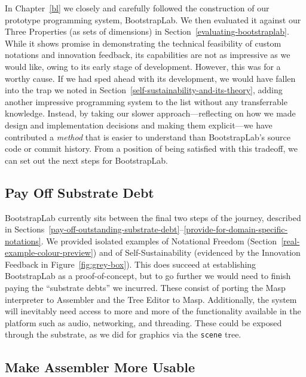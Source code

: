 \documentclass[ twoside,openright,titlepage,numbers=noenddot,headinclude,footinclude,cleardoublepage=empty,abstract=on,
                BCOR=5mm,paper=a4,fontsize=11pt
                ]{scrreprt}
\theoremstyle{definition}
\begin{document}
In Chapter~\ref{bl} we closely and carefully followed the construction
of our prototype programming system, BootstrapLab. We then evaluated it
against our Three Properties (as sets of dimensions) in
Section~\ref{evaluating-bootstraplab}. While it shows promise in
demonstrating the technical feasibility of custom notations and
innovation feedback, its capabilities are not as impressive as we would
like, owing to its early stage of development. However, this was for a
worthy cause. If we had sped ahead with its development, we would have
fallen into the trap we noted in
Section~\ref{self-sustainability-and-its-theory}, adding another
impressive programming system to the list without any transferrable
knowledge. Instead, by taking our slower approach---reflecting on how we
made design and implementation decisions and making them explicit---we
have contributed a \emph{method} that is easier to understand than
BootstrapLab's source code or commit history. From a position of being
satisfied with this tradeoff, we can set out the next steps for
BootstrapLab.

\hypertarget{pay-off-substrate-debt}{\subsection{Pay Off Substrate Debt}\label{pay-off-substrate-debt}}

BootstrapLab currently sits between the final two steps of the journey,
described in
Sections~\ref{pay-off-outstanding-substrate-debt}--\ref{provide-for-domain-specific-notations}.
We provided isolated examples of Notational Freedom
(Section~\ref{real-example-colour-preview}) and of Self-Sustainability
(evidenced by the Innovation Feedback in Figure~\ref{fig:grey-box}).
This does succeed at establishing BootstrapLab as a proof-of-concept,
but to go further we would need to finish paying the ``substrate debts''
we incurred. These consist of porting the Masp interpreter to Assembler
and the Tree Editor to Masp. Additionally, the system will inevitably
need access to more and more of the functionality available in the
platform such as audio, networking, and threading. These could be
exposed through the substrate, as we did for graphics via the
\texttt{scene} tree.

\hypertarget{make-assembler-more-usable}{\subsection{Make Assembler More
Usable}\label{make-assembler-more-usable}}
\end{document}
